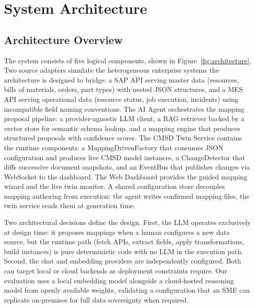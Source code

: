 \documentclass[3p,times,procedia]{elsarticle}
\begin{document}
\section{System Architecture}
\label{sec:architecture}

\subsection{Architecture Overview}
\label{sec:arch-overview}

The system consists of five logical components, shown in Figure~\ref{fig:architecture}. Two source adapters simulate the heterogeneous enterprise systems the architecture is designed to bridge: a SAP API serving master data (resources, bills of materials, orders, part types) with nested JSON structures, and a MES API serving operational data (resource status, job execution, incidents) using incompatible field naming conventions. The AI Agent orchestrates the mapping proposal pipeline: a provider-agnostic LLM client, a RAG retriever backed by a vector store for semantic schema lookup, and a mapping engine that produces structured proposals with confidence scores. The CMSD Twin Service contains the runtime components: a MappingDrivenFactory that consumes JSON configuration and produces live CMSD model instances, a ChangeDetector that diffs successive document snapshots, and an EventBus that publishes changes via WebSocket to the dashboard. The Web Dashboard provides the guided mapping wizard and the live twin monitor. A shared configuration store decouples mapping authoring from execution: the agent writes confirmed mapping files, the twin service reads them at generation time.

Two architectural decisions define the design. First, the LLM operates exclusively at design time: it proposes mappings when a human configures a new data source, but the runtime path (fetch APIs, extract fields, apply transformations, build instances) is pure deterministic code with no LLM in the execution path. Second, the chat and embedding providers are independently configured. Both can target local or cloud backends as deployment constraints require. Our evaluation uses a local embedding model alongside a cloud-hosted reasoning model from openly available weights, validating a configuration that an SME can replicate on-premises for full data sovereignty when required.
\end{document}
